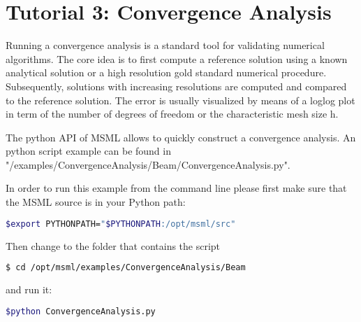 \chapter{Tutorial 3: Convergence Analysis}

Running a convergence analysis is a standard tool for validating numerical algorithms. The core idea is to first compute a reference solution using a known analytical solution or a high resolution gold standard numerical procedure. Subsequently, solutions with increasing resolutions are computed and compared to the reference solution. The error is usually visualized by means of a loglog plot in term of the number of degrees of freedom or the characteristic mesh size h.

The python API of MSML allows to quickly construct a convergence analysis. An python script example can be found in "/examples/ConvergenceAnalysis/Beam/ConvergenceAnalysis.py". 

In order to run this example from the command line please first make sure that the MSML source is in your Python path:

\begin{lstlisting}[language=sh, breaklines=true]
$export PYTHONPATH="$PYTHONPATH:/opt/msml/src"
\end{lstlisting}

Then change to the folder that contains the script

\begin{lstlisting}[language=sh, breaklines=true]
$ cd /opt/msml/examples/ConvergenceAnalysis/Beam
\end{lstlisting}

and run it:

\begin{lstlisting}[language=sh, breaklines=true]
$python ConvergenceAnalysis.py
\end{lstlisting}
